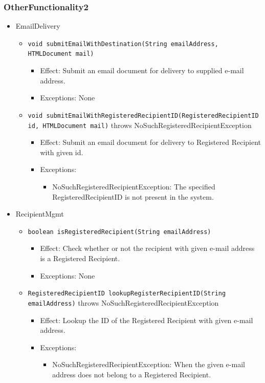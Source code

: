 \documentclass[a4paper,10pt]{article}
\begin{document}
\subsubsection*{OtherFunctionality2}
\begin{itemize}
    \item EmailDelivery
    \begin{itemize}
        \item \texttt{void submitEmailWithDestination(String emailAddress, HTMLDocument mail)}
        \begin{itemize}
            \item Effect: Submit an email document for delivery to supplied e-mail address.
            \item Exceptions: None
        \end{itemize}

        \item \texttt{void submitEmailWithRegisteredRecipientID(RegisteredRecipientID id, HTMLDocument mail)} throws NoSuchRegisteredRecipientException
        \begin{itemize}
            \item Effect: Submit an email document for delivery to Registered Recipient with given id.
            \item Exceptions:
            \begin{itemize}
                \item NoSuchRegisteredRecipientException: The specified RegisteredRecipientID is not present in the system.
            \end{itemize}
        \end{itemize}
    \end{itemize}

    \item RecipientMgmt
    \begin{itemize}
        \item \texttt{boolean isRegisteredRecipient(String emailAddress)}
        \begin{itemize}
            \item Effect: Check whether or not the recipient with given e-mail address is a Registered Recipient.
            \item Exceptions: None
        \end{itemize}

        \item \texttt{RegisteredRecipientID lookupRegisterRecipientID(String emailAddress)} throws NoSuchRegisteredRecipientException
        \begin{itemize}
            \item Effect: Lookup the ID of the Registered Recipient with given e-mail address.
            \item Exceptions:
            \begin{itemize}
                \item NoSuchRegisteredRecipientException: When the given e-mail address does not belong to a Registered Recipient.
            \end{itemize}
        \end{itemize}
    \end{itemize}


\end{itemize}
\end{document}

